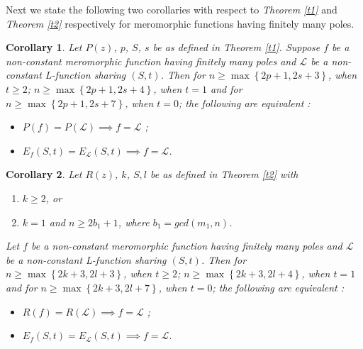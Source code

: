 \documentclass[a4paper,draft]{amsproc}
\theoremstyle{plain}
\newtheorem{cor}{Corollary}[section]
\theoremstyle{definition}
\theoremstyle{remark}
\numberwithin{equation}{section}
\begin{document}
Next we state the following two corollaries with respect to {\em Theorem \ref{t1}} and {\em Theorem \ref{t2}} respectively for meromorphic functions having finitely many poles. %
\begin{cor}\label{c1}
	Let $P(z)$, $p$, $S$, $s$ be as defined in {\em Theorem \ref{t1}}.
	Suppose $f$ be a non-constant meromorphic function having finitely many poles and  $\mathcal{L}$
	be a non-constant L-function sharing $(S,t)$.
	Then for $n \geq \max \left\{2p+1,2s+3\right\}$, when $t\geq2$; $n \geq \max \left\{2p+1,2s+4\right\}$, when $t=1$ and for $n \geq \max \left\{2p+1,2s+7\right\}$, when $t=0$; the following are equivalent :
	\begin{itemize}
		\item[(i)] $P(f)=P(\mathcal{L}) \implies f=\mathcal{L}$ ;
		\item[(ii)] $E_f(S, t)=E_\mathcal{L}(S,t)\implies f=\mathcal{L}$.
	\end{itemize}
\end{cor}
\begin{cor}\label{c2}
	Let $R(z)$, $k$,  $S, l$ be as defined in {\em Theorem \ref{t2}} with \begin{enumerate}
		\item[(a)] $k\geq2$, or
		\item[(b)] $k=1$ and  $n\geq 2b_1+1$, where $b_1=gcd(m_1,n)$.
	\end{enumerate} 
	Let $f$ be a non-constant meromorphic function having finitely many poles and  $\mathcal{L}$
	be a non-constant L-function sharing $(S,t)$.
	Then for $n \geq \max \left\{2k+3,2l+3\right\}$, when $t\geq2$; $n \geq \max \left\{2k+3,2l+4\right\}$, when $t=1$ and for $n \geq \max \left\{2k+3,2l+7\right\}$, when $t=0$; the following are equivalent :
	\begin{itemize}
		\item[(i)] $R(f)=R(\mathcal{L}) \implies f=\mathcal{L}$ ;
		\item[(ii)] $E_f(S, t)=E_\mathcal{L}(S,t)\implies f=\mathcal{L}$.	\end{itemize}	
	
\end{cor}   
\end{document}
